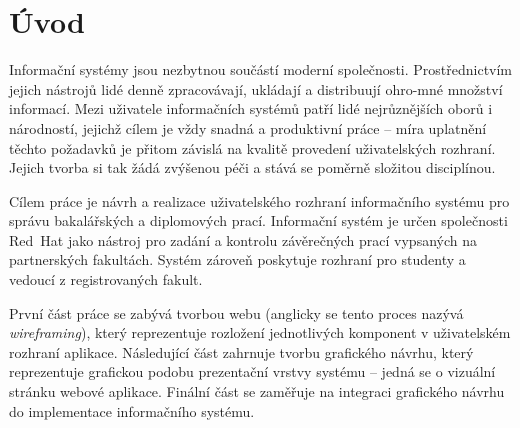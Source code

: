 \chapter{Úvod}

Informační systémy jsou nezbytnou součástí moderní společnosti. Prostřednictvím jejich nástrojů lidé denně zpracovávají, ukládají a distribuují ohro-mné množství informací. Mezi uživatele informačních systémů patří lidé nejrůznějších oborů i národností, jejichž cílem je vždy snadná a produktivní práce -- míra uplatnění těchto požadavků je přitom závislá na kvalitě provedení uživatelských rozhraní. Jejich tvorba si tak žádá zvýšenou péči a stává se poměrně složitou disciplínou.

Cílem práce je návrh a realizace uživatelského rozhraní informačního systému pro správu bakalářských a diplomových prací. Informační systém je určen společnosti Red~Hat jako nástroj pro zadání a kontrolu závěrečných prací vypsaných na partnerských fakultách. Systém zároveň poskytuje rozhraní pro studenty a vedoucí z registrovaných fakult.

První část práce se zabývá tvorbou  webu (anglicky se tento proces nazývá \textit{wireframing}), který reprezentuje rozložení jednotlivých komponent v uživatelském rozhraní aplikace. Následující část zahrnuje tvorbu grafického návrhu, který reprezentuje grafickou podobu prezentační vrstvy systému -- jedná se o vizuální stránku webové aplikace. Finální část se zaměřuje na integraci grafického návrhu do implementace informačního systému.
